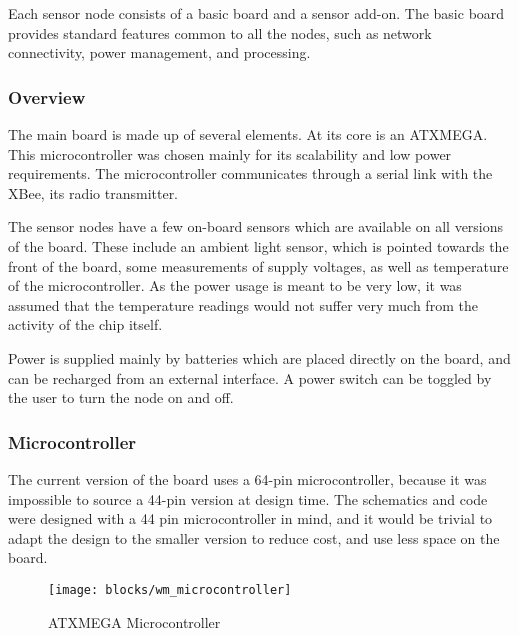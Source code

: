 Each sensor node consists of a basic board and a sensor add-on. The basic board
provides standard features common to all the nodes, such as network
connectivity, power management, and processing.

\subsubsection{Overview}

The main board is made up of several elements. At its core is an ATXMEGA. This
microcontroller was chosen mainly for its scalability and low power
requirements. The microcontroller communicates through a serial link with the
XBee, its radio transmitter.

The sensor nodes have a few on-board sensors which are available on all versions
of the board. These include an ambient light sensor, which is pointed towards
the front of the board, some measurements of supply voltages, as well as
temperature of the microcontroller. As the power usage is meant to be very low,
it was assumed that the temperature readings would not suffer very much from
the activity of the chip itself.

Power is supplied mainly by batteries which are placed directly on the board,
and can be recharged from an external interface. A power switch can be toggled
by the user to turn the node on and off.

\subsubsection{Microcontroller}

The current version of the board uses a 64-pin microcontroller, because it
was impossible to source a 44-pin version at design time. The schematics and
code were designed with a 44 pin microcontroller in mind, and it would be
trivial to adapt the design to the smaller version to reduce cost, and use less
space on the board.

\begin{figure}[htpb]
  \begin{center}
    \texttt{[image: blocks/wm\_microcontroller]}
  \end{center}
  \caption{ATXMEGA Microcontroller}
  \label{fig:microcontroller}
\end{figure}


